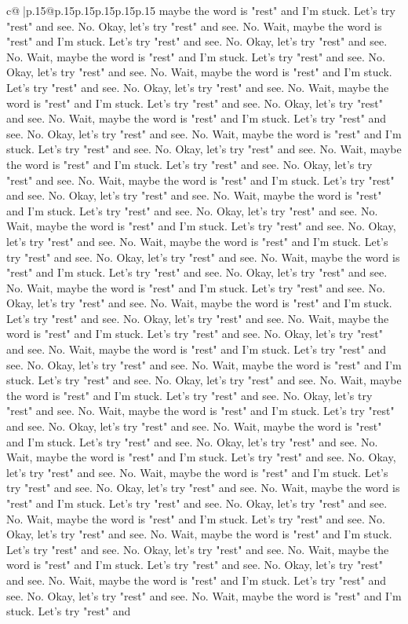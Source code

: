 \documentclass{article}
\begin{document}
{\begin{supertabular}{c@{$\;$}|p{.15\linewidth}@{}p{.15\linewidth}p{.15\linewidth}p{.15\linewidth}p{.15\linewidth}p{.15\linewidth}}
{{{maybe the word is "rest" and I'm stuck. Let's try "rest" and see. No. Okay, let's try "rest" and see. No. Wait, maybe the word is "rest" and I'm stuck. Let's try "rest" and see. No. Okay, let's try "rest" and see. No. Wait, maybe the word is "rest" and I'm stuck. Let's try "rest" and see. No. Okay, let's try "rest" and see. No. Wait, maybe the word is "rest" and I'm stuck. Let's try "rest" and see. No. Okay, let's try "rest" and see. No. Wait, maybe the word is "rest" and I'm stuck. Let's try "rest" and see. No. Okay, let's try "rest" and see. No. Wait, maybe the word is "rest" and I'm stuck. Let's try "rest" and see. No. Okay, let's try "rest" and see. No. Wait, maybe the word is "rest" and I'm stuck. Let's try "rest" and see. No. Okay, let's try "rest" and see. No. Wait, maybe the word is "rest" and I'm stuck. Let's try "rest" and see. No. Okay, let's try "rest" and see. No. Wait, maybe the word is "rest" and I'm stuck. Let's try "rest" and see. No. Okay, let's try "rest" and see. No. Wait, maybe the word is "rest" and I'm stuck. Let's try "rest" and see. No. Okay, let's try "rest" and see. No. Wait, maybe the word is "rest" and I'm stuck. Let's try "rest" and see. No. Okay, let's try "rest" and see. No. Wait, maybe the word is "rest" and I'm stuck. Let's try "rest" and see. No. Okay, let's try "rest" and see. No. Wait, maybe the word is "rest" and I'm stuck. Let's try "rest" and see. No. Okay, let's try "rest" and see. No. Wait, maybe the word is "rest" and I'm stuck. Let's try "rest" and see. No. Okay, let's try "rest" and see. No. Wait, maybe the word is "rest" and I'm stuck. Let's try "rest" and see. No. Okay, let's try "rest" and see. No. Wait, maybe the word is "rest" and I'm stuck. Let's try "rest" and see. No. Okay, let's try "rest" and see. No. Wait, maybe the word is "rest" and I'm stuck. Let's try "rest" and see. No. Okay, let's try "rest" and see. No. Wait, maybe the word is "rest" and I'm stuck. Let's try "rest" and see. No. Okay, let's try "rest" and see. No. Wait, maybe the word is "rest" and I'm stuck. Let's try "rest" and see. No. Okay, let's try "rest" and see. No. Wait, maybe the word is "rest" and I'm stuck. Let's try "rest" and see. No. Okay, let's try "rest" and see. No. Wait, maybe the word is "rest" and I'm stuck. Let's try "rest" and see. No. Okay, let's try "rest" and see. No. Wait, maybe the word is "rest" and I'm stuck. Let's try "rest" and see. No. Okay, let's try "rest" and see. No. Wait, maybe the word is "rest" and I'm stuck. Let's try "rest" and see. No. Okay, let's try "rest" and see. No. Wait, maybe the word is "rest" and I'm stuck. Let's try "rest" and see. No. Okay, let's try "rest" and see. No. Wait, maybe the word is "rest" and I'm stuck. Let's try "rest" and see. No. Okay, let's try "rest" and see. No. Wait, maybe the word is "rest" and I'm stuck. Let's try "rest" and see. No. Okay, let's try "rest" and see. No. Wait, maybe the word is "rest" and I'm stuck. Let's try "rest" and see. No. Okay, let's try "rest" and see. No. Wait, maybe the word is "rest" and I'm stuck. Let's try "rest" and see. No. Okay, let's try "rest" and see. No. Wait, maybe the word is "rest" and I'm stuck. Let's try "rest" and }}}
\end{supertabular}}
\end{document}
